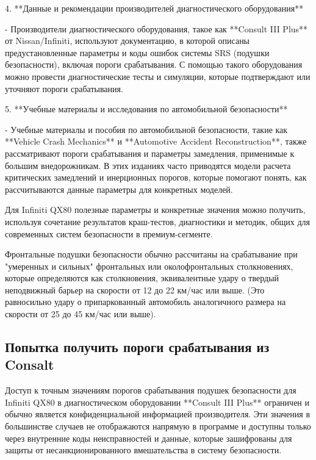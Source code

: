  4. **Данные и рекомендации производителей диагностического оборудования**

- Производители диагностического оборудования, такое как **Consult III Plus** от Nissan/Infiniti, используют документацию, в которой описаны предустановленные параметры и коды ошибок системы SRS (подушки безопасности), включая пороги срабатывания. С помощью такого оборудования можно провести диагностические тесты и симуляции, которые подтверждают или уточняют пороги срабатывания.

 5. **Учебные материалы и исследования по автомобильной безопасности**

- Учебные материалы и пособия по автомобильной безопасности, такие как **Vehicle Crash Mechanics** и **Automotive Accident Reconstruction**, также рассматривают пороги срабатывания и параметры замедления, применимые к большим внедорожникам. В этих изданиях часто приводятся модели расчета критических замедлений и инерционных порогов, которые помогают понять, как рассчитываются данные параметры для конкретных моделей.

Для Infiniti QX80 полезные параметры и конкретные значения можно получить, используя сочетание результатов краш-тестов, диагностики и методик, общих для современных систем безопасности в премиум-сегменте.


\vspace{10mm}

Фронтальные подушки безопасности обычно рассчитаны на срабатывание при "умеренных и сильных" фронтальных или околофронтальных столкновениях, которые определяются как столкновения, эквивалентные удару о твердый неподвижный барьер на скорости от 12 до 22 км/час или выше. (Это равносильно удару о припаркованный автомобиль аналогичного размера на скорости от 25 до 45 км/час или выше).






\subsection{Попытка получить пороги срабатывания из Consalt}


Доступ к точным значениям порогов срабатывания подушек безопасности для Infiniti QX80 в диагностическом оборудовании **Consult III Plus** ограничен и обычно является конфиденциальной информацией производителя. Эти значения в большинстве случаев не отображаются напрямую в программе и доступны только через внутренние коды неисправностей и данные, которые зашифрованы для защиты от несанкционированного вмешательства в систему безопасности.

